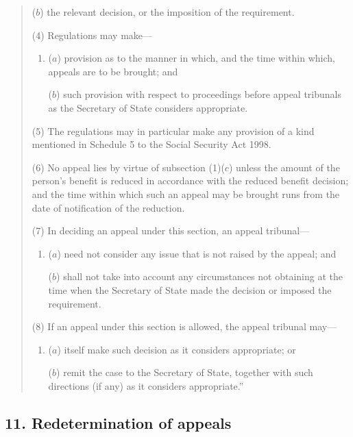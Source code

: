 \documentclass[12pt,a4paper]{article}
\begin{document}
\begin{quotation}
\begin{enumerate}
($b$) the relevant decision, or the imposition of the requirement.
\end{enumerate}

(4) Regulations may make—
\begin{enumerate}\item[]
($a$) provision as to the manner in which, and the time within which, appeals are to be brought; and

($b$) such provision with respect to proceedings before appeal tribunals as the Secretary of State considers appropriate.
\end{enumerate}

(5) The regulations may in particular make any provision of a kind mentioned in Schedule 5 to the Social Security Act 1998. 

(6) No appeal lies by virtue of subsection (1)($c$)  unless the amount of the person’s benefit is reduced in accordance with the reduced benefit decision; and the time within which such an appeal may be brought runs from the date of notification of the reduction.

(7) In deciding an appeal under this section, an appeal tribunal—
\begin{enumerate}\item[]
($a$) need not consider any issue that is not raised by the appeal; and

($b$) shall not take into account any circumstances not obtaining at the time when the Secretary of State made the decision or imposed the requirement.
\end{enumerate}

(8) If an appeal under this section is allowed, the appeal tribunal may—
\begin{enumerate}\item[]
($a$) itself make such decision as it considers appropriate; or

($b$) remit the case to the Secretary of State, together with such directions (if any) as it considers appropriate.”
\end{enumerate}
\end{quotation}


\subsection{11. Redetermination of appeals}
\end{document}
